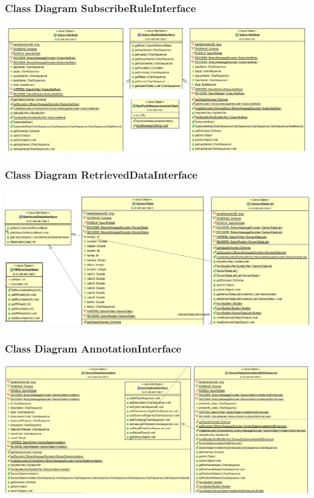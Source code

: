 \documentclass{beamer}
\begin{document}
\begin{frame}
\frametitle{Class Diagram SubscribeRuleInterface}
\includegraphics[width=1\textwidth]{images/figura10.png}
\end{frame}

\begin{frame}
\frametitle{Class Diagram RetrievedDataInterface}
\includegraphics[width=1\textwidth]{images/ClassDiagram1.png}
\end{frame}

\begin{frame}
\frametitle{Class Diagram AnnotationInterface}
\includegraphics[width=1\textwidth]{images/annotationinterface.png}
\end{frame}
\end{document}

